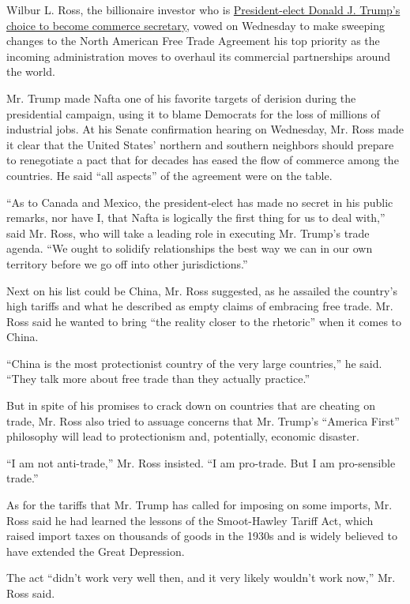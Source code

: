 Wilbur L. Ross, the billionaire investor who is
\href{https://www.nytimes.com/2016/11/24/us/politics/wilbur-ross-commerce-trump.html}{President-elect
Donald J. Trump's choice to become commerce secretary}, vowed on
Wednesday to make sweeping changes to the North American Free Trade
Agreement his top priority as the incoming administration moves to
overhaul its commercial partnerships around the world.

Mr. Trump made Nafta one of his favorite targets of derision during the
presidential campaign, using it to blame Democrats for the loss of
millions of industrial jobs. At his Senate confirmation hearing on
Wednesday, Mr. Ross made it clear that the United States' northern and
southern neighbors should prepare to renegotiate a pact that for decades
has eased the flow of commerce among the countries. He said ``all
aspects'' of the agreement were on the table.

``As to Canada and Mexico, the president-elect has made no secret in his
public remarks, nor have I, that Nafta is logically the first thing for
us to deal with,'' said Mr. Ross, who will take a leading role in
executing Mr. Trump's trade agenda. ``We ought to solidify relationships
the best way we can in our own territory before we go off into other
jurisdictions.''

Next on his list could be China, Mr. Ross suggested, as he assailed the
country's high tariffs and what he described as empty claims of
embracing free trade. Mr. Ross said he wanted to bring ``the reality
closer to the rhetoric'' when it comes to China.

``China is the most protectionist country of the very large countries,''
he said. ``They talk more about free trade than they actually
practice.''

But in spite of his promises to crack down on countries that are
cheating on trade, Mr. Ross also tried to assuage concerns that Mr.
Trump's ``America First'' philosophy will lead to protectionism and,
potentially, economic disaster.

``I am not anti-trade,'' Mr. Ross insisted. ``I am pro-trade. But I am
pro-sensible trade.''

As for the tariffs that Mr. Trump has called for imposing on some
imports, Mr. Ross said he had learned the lessons of the Smoot-Hawley
Tariff Act, which raised import taxes on thousands of goods in the 1930s
and is widely believed to have extended the Great Depression.

The act ``didn't work very well then, and it very likely wouldn't work
now,'' Mr. Ross said.

